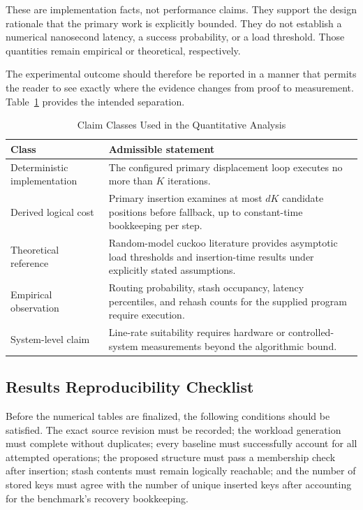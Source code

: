 \documentclass[conference]{IEEEtran}
\begin{document}
These are implementation facts, not performance claims. They support the design rationale that the primary work is explicitly bounded. They do not establish a numerical nanosecond latency, a success probability, or a load threshold. Those quantities remain empirical or theoretical, respectively.

The experimental outcome should therefore be reported in a manner that permits the reader to see exactly where the evidence changes from proof to measurement. Table~\ref{tab:claim-layer-results} provides the intended separation.

\begin{table}[!t]
\caption{Claim Classes Used in the Quantitative Analysis}
\label{tab:claim-layer-results}
\centering
\begin{tabular}{|p{}|p{}|}
\hline
\textbf{Class} & \textbf{Admissible statement} \\
\hline
Deterministic implementation & The configured primary displacement loop executes no more than $K$ iterations. \\
\hline
Derived logical cost & Primary insertion examines at most $dK$ candidate positions before fallback, up to constant-time bookkeeping per step. \\
\hline
Theoretical reference & Random-model cuckoo literature provides asymptotic load thresholds and insertion-time results under explicitly stated assumptions. \\
\hline
Empirical observation & Routing probability, stash occupancy, latency percentiles, and rehash counts for the supplied program require execution. \\
\hline
System-level claim & Line-rate suitability requires hardware or controlled-system measurements beyond the algorithmic bound. \\
\hline
\end{tabular}
\end{table}

\subsection{Results Reproducibility Checklist}
\label{subsec:results_checklist}

Before the numerical tables are finalized, the following conditions should be satisfied. The exact source revision must be recorded; the workload generation must complete without duplicates; every baseline must successfully account for all attempted operations; the proposed structure must pass a membership check after insertion; stash contents must remain logically reachable; and the number of stored keys must agree with the number of unique inserted keys after accounting for the benchmark's recovery bookkeeping.
\end{document}
